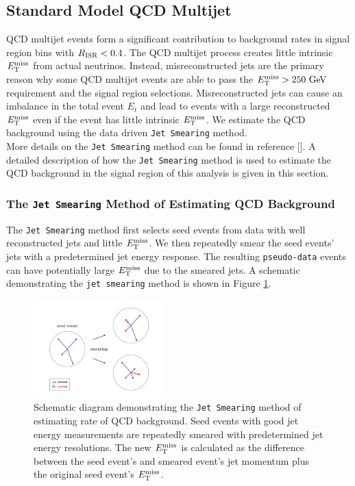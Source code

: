 \subsection{Standard Model QCD Multijet}
\label{sec:Bkg:QCD}

\indent  QCD multijet events form a significant contribution to background rates in signal region bins with $R_{\mathrm{ISR}} < 0.4$.  The QCD multijet process creates little intrinsic $E_{\mathrm{T}}^{\mathrm{miss}}$ from actual neutrinos. Instead, misreconstructed jets are the primary reason why some QCD multijet events are able to pass the $\met > 250 \gev$ requirement and the signal region selections.  Misreconstructed jets can cause an imbalance in the total event $E_t$ and lead to events with a large reconstructed $E_{\mathrm{T}}^{\mathrm{miss}}$ even if the event has little intrinsic $E_{\mathrm{T}}^{\mathrm{miss}}$.  We estimate the QCD background using the data driven {\tt Jet Smearing} method. \\

\indent More details on the {\tt Jet Smearing} method can be found in reference [\cite{JetSmearing}].  A detailed description of how the {\tt Jet Smearing} method is used to estimate the QCD background in the signal region of this analysis is given in this section. \\

\subsubsection{The {\tt Jet Smearing} Method of Estimating QCD Background}

\indent The {\tt Jet Smearing} method first selects seed events from data with well reconstructed jets and little $E_{\mathrm{T}}^{\mathrm{miss}}$.  We then repeatedly smear the seed events' jets with a predetermined jet energy response.  The resulting {\tt pseudo-data} events can have potentially large $E_{\mathrm{T}}^{\mathrm{miss}}$ due to the smeared jets.  A schematic demonstrating the {\tt jet smearing} method is shown in Figure \ref{fig:jetsmearing}.\\

\begin{figure}[h!]
\begin{center}
\includegraphics[width=0.45\textwidth]{figures/QCDJetSmearing/jet_smearing.pdf}
\end{center}
\caption[~Schematic diagram demonstrating the {\tt Jet Smearing} method of estimating QCD background]{Schematic diagram demonstrating the {\tt Jet Smearing} method of estimating rate of QCD background.  Seed events with good jet energy measurements are repeatedly smeared with predetermined jet energy resolutions.  The new $E_{\mathrm{T}}^{\mathrm{miss}}$ is calculated as the difference between the seed event's and smeared event's jet momentum plus the original seed event's $E_{\mathrm{T}}^{\mathrm{miss}}$.\cite{JetSmearing} }
\label{fig:jetsmearing}
\end{figure}

